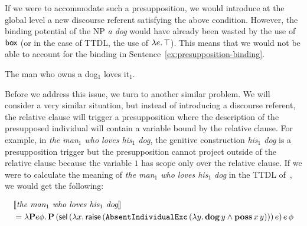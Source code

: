If we were to accommodate such a presupposition, we would introduce at the
global level a new discourse referent satisfying the above
condition. However, the binding potential of the NP \emph{a dog} would have
already been wasted by the use of $\textsf{box}$ (or in the case of TTDL, the use
of $\lambda e.\, \top$). This means that we would not be able to account for
the binding in Sentence~\ref{ex:presupposition-binding}.

\begin{exe}
  \ex The man who owns a dog$_1$ loves it$_1$. \label{ex:presupposition-binding}
\end{exe}

Before we address this issue, we turn to another similar problem. We will
consider a very similar situation, but instead of introducing a discourse
referent, the relative clause will trigger a presupposition where the
description of the presupposed individual will contain a variable bound by
the relative clause. For example, in \emph{the man$_1$ who loves his$_1$
  dog}, the genitive construction \emph{his$_1$ dog} is a presupposition
trigger but the presupposition cannot project outside of the relative
clause because the variable $1$ has scope only over the relative clause. If
we were to calculate the meaning of \emph{the man$_1$ who loves his$_1$
  dog} in the TTDL of~\cite{lebedeva2012expression}, we would get the
following:

\begin{align*}
& \llbracket \textit{the man$_1$ who loves his$_1$ dog} \rrbracket \\
& = \lambda \textbf{P} e \phi.\, \textbf{P}\,(\textsf{sel}\,(\lambda x.\, \textsf{raise}\,(\texttt{AbsentIndividualExc}\,(\lambda y.\, \textbf{dog}\,y \land \textbf{poss}\,x\,y)))\,e)\,e\,\phi
\end{align*}

